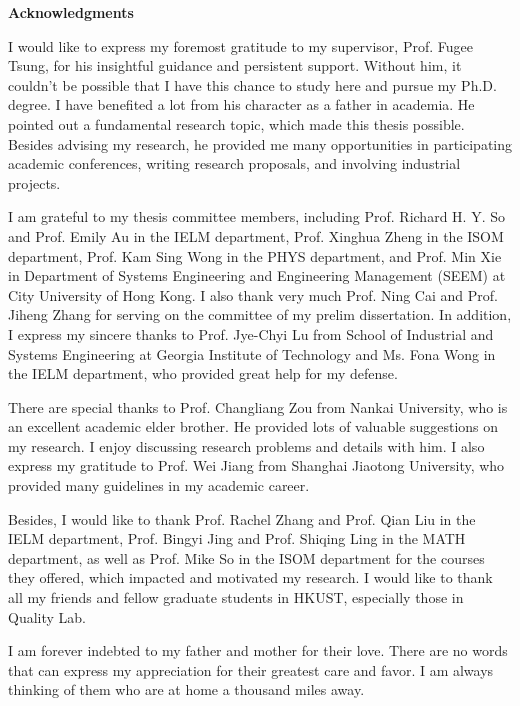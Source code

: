 \centerline{{\bf \Large Acknowledgments}} \vspace{5mm} \noindent

I would like to express my foremost gratitude to my supervisor, Prof. Fugee Tsung,
for his insightful guidance and persistent support. Without him, it couldn't be
possible that I have this chance to study here and pursue my Ph.D. degree. I have
benefited a lot from his character as a father in academia. He pointed out a
fundamental research topic, which made this thesis possible. Besides advising my
research, he provided me many opportunities in participating academic conferences,
writing research proposals, and involving industrial projects.

I am grateful to my thesis committee members, including Prof. Richard H. Y. So and
Prof. Emily Au in the IELM department, Prof. Xinghua Zheng in the ISOM department,
Prof. Kam Sing Wong in the PHYS department, and Prof. Min Xie in Department of
Systems Engineering and Engineering Management (SEEM) at City University of Hong
Kong. I also thank very much Prof. Ning Cai and Prof. Jiheng Zhang for serving on
the committee of my prelim dissertation. In addition, I express my sincere thanks to
Prof. Jye-Chyi Lu from School of Industrial and Systems Engineering at Georgia
Institute of Technology and Ms. Fona Wong in the IELM department, who provided great
help for my defense.

There are special thanks to Prof. Changliang Zou from Nankai University, who is an
excellent academic elder brother. He provided lots of valuable suggestions on my
research. I enjoy discussing research problems and details with him. I also express
my gratitude to Prof. Wei Jiang from Shanghai Jiaotong University, who provided many
guidelines in my academic career.

Besides, I would like to thank Prof. Rachel Zhang and Prof. Qian Liu in the IELM
department, Prof. Bingyi Jing and Prof. Shiqing Ling in the MATH department, as well
as Prof. Mike So in the ISOM department for the courses they offered, which impacted
and motivated my research. I would like to thank all my friends and fellow graduate
students in HKUST, especially those in Quality Lab.

I am forever indebted to my father and mother for their love. There are no words
that can express my appreciation for their greatest care and favor. I am always
thinking of them who are at home a thousand miles away.
